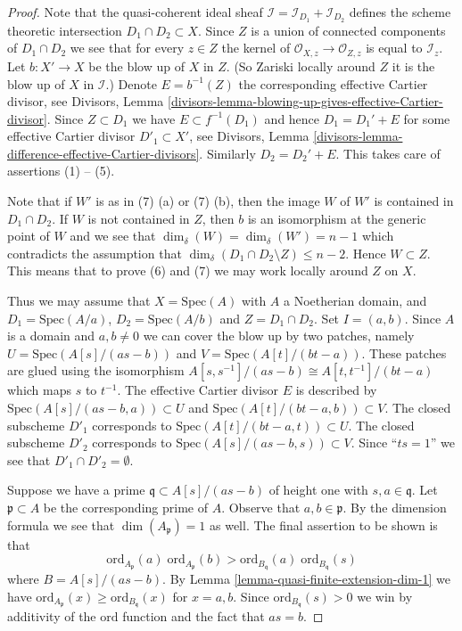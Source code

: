 \begin{proof}
Note that the quasi-coherent ideal sheaf
$\mathcal{I} = \mathcal{I}_{D_1} + \mathcal{I}_{D_2}$
defines the scheme theoretic intersection $D_1 \cap D_2 \subset X$.
Since $Z$ is a union of connected components of $D_1 \cap D_2$
we see that for every $z \in Z$ the kernel of
$\mathcal{O}_{X, z} \to \mathcal{O}_{Z, z}$ is equal to $\mathcal{I}_z$.
Let $b : X' \to X$ be the blow up of $X$ in $Z$. (So Zariski locally
around $Z$ it is the blow up of $X$ in $\mathcal{I}$.)
Denote $E = b^{-1}(Z)$ the corresponding effective Cartier divisor, see
Divisors,
Lemma \ref{divisors-lemma-blowing-up-gives-effective-Cartier-divisor}.
Since $Z \subset D_1$ we have $E \subset f^{-1}(D_1)$ and hence
$D_1 = D_1' + E$ for some effective Cartier divisor $D'_1 \subset X'$,
see Divisors, Lemma \ref{divisors-lemma-difference-effective-Cartier-divisors}.
Similarly $D_2 = D_2' + E$. This takes care of assertions (1) -- (5).

\medskip\noindent
Note that if $W'$ is as in (7) (a) or (7) (b), then the image $W$
of $W'$ is contained in $D_1 \cap D_2$. If $W$ is not contained in
$Z$, then $b$ is an isomorphism at the generic point of $W$ and
we see that $\dim_\delta(W) = \dim_\delta(W') = n - 1$ which
contradicts the assumption that
$\dim_\delta(D_1 \cap D_2 \setminus Z) \leq n - 2$.
Hence $W \subset Z$. This means that
to prove (6) and (7) we may work locally around $Z$ on $X$.

\medskip\noindent
Thus we may assume that $X = \text{Spec}(A)$ with
$A$ a Noetherian domain, and $D_1 = \text{Spec}(A/a)$,
$D_2 = \text{Spec}(A/b)$ and $Z = D_1 \cap D_2$.
Set $I = (a, b)$. Since $A$ is a domain and $a, b \not = 0$ we can
cover the blow up by two patches, namely
$U = \text{Spec}(A[s]/(as - b))$ and $V = \text{Spec}(A[t]/(bt -a))$.
These patches are glued using the isomorphism
$A[s, s^{-1}]/(as - b) \cong A[t, t^{-1}]/(bt - a)$
which maps $s$ to $t^{-1}$.
The effective Cartier divisor $E$ is described by
$\text{Spec}(A[s]/(as - b, a)) \subset U$ and
$\text{Spec}(A[t]/(bt - a, b)) \subset V$.
The closed subscheme $D'_1$ corresponds to
$\text{Spec}(A[t]/(bt - a, t)) \subset U$.
The closed subscheme $D'_2$ corresponds to
$\text{Spec}(A[s]/(as -b, s)) \subset V$.
Since ``$ts = 1$'' we see that $D'_1 \cap D'_2 = \emptyset$.

\medskip\noindent
Suppose we have a prime $\mathfrak q \subset A[s]/(as - b)$
of height one with $s, a \in \mathfrak q$.
Let $\mathfrak p \subset A$ be the corresponding prime of $A$.
Observe that $a, b \in \mathfrak p$.
By the dimension formula we see that $\dim(A_{\mathfrak p}) = 1$
as well. The final assertion to be shown is that
$$
\text{ord}_{A_{\mathfrak p}}(a)
\;
\text{ord}_{A_{\mathfrak p}}(b)
>
\text{ord}_{B_{\mathfrak q}}(a)
\;
\text{ord}_{B_{\mathfrak q}}(s)
$$
where $B = A[s]/(as - b)$. By Lemma \ref{lemma-quasi-finite-extension-dim-1}
we have $\text{ord}_{A_{\mathfrak p}}(x) \geq \text{ord}_{B_{\mathfrak q}}(x)$
for $x = a, b$. Since $\text{ord}_{B_{\mathfrak q}}(s) > 0$ we win
by additivity of the $\text{ord}$ function and the fact that
$as = b$.
\end{proof}

